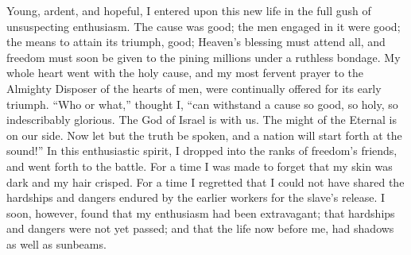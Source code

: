 Young, ardent, and hopeful, I entered upon this new life in the full
gush of unsuspecting enthusiasm. The cause was good; the men engaged in
it were {\protect\hypertarget{360}{}{}}good; the means to attain its
triumph, good; Heaven's blessing must attend all, and freedom must soon
be given to the pining millions under a ruthless bondage. My whole heart
went with the holy cause, and my most fervent prayer to the Almighty
Disposer of the hearts of men, were continually offered for its early
triumph. ``Who or what,'' thought I, ``can withstand a cause so good, so
holy, so indescribably glorious. The God of Israel is with us. The might
of the Eternal is on our side. Now let but the truth be spoken, and a
nation will start forth at the sound!'' In this enthusiastic spirit, I
dropped into the ranks of freedom's friends, and went forth to the
battle. For a time I was made to forget that my skin was dark and my
hair crisped. For a time I regretted that I could not have shared the
hardships and dangers endured by the earlier workers for the slave's
release. I soon, however, found that my enthusiasm had been extravagant;
that hardships and dangers were not yet passed; and that the life now
before me, had shadows as well as sunbeams.


